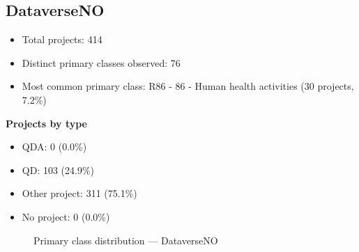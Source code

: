 \subsection{DataverseNO}

\begin{itemize}
    \item Total projects: 414
    \item Distinct primary classes observed: 76
    \item Most common primary class: R86 - 86 - Human health activities (30 projects, 7.2\%)
\end{itemize}
\textbf{Projects by type}
\begin{itemize}
    \item QDA: 0 (0.0\%)
    \item QD: 103 (24.9\%)
    \item Other project: 311 (75.1\%)
    \item No project: 0 (0.0\%)
\end{itemize}

\begin{figure}[H]
    \centering
    
    \caption{Primary class distribution --- DataverseNO}
\end{figure}

